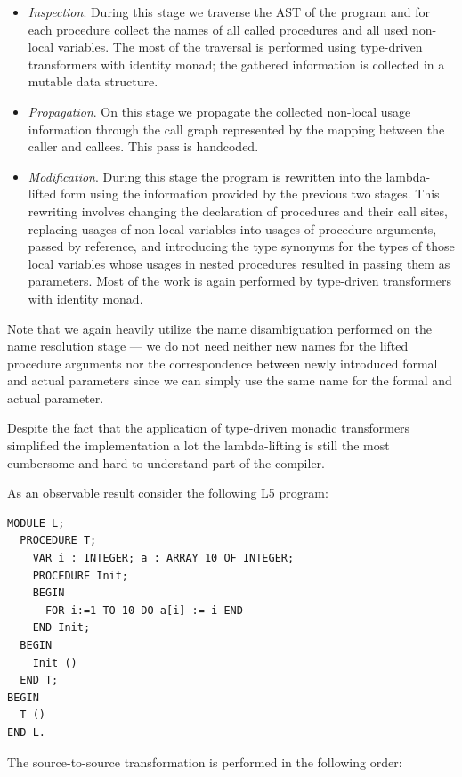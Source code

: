 \begin{itemize}
\item \emph{Inspection}. During this stage we traverse the AST of the program and for each procedure collect the 
names of all called procedures and all used non-local variables. The most of the 
traversal is performed using type-driven transformers with identity monad; the gathered information is 
collected in a mutable data structure. 

\item \emph{Propagation}. On this stage we propagate the collected non-local usage information through the call
graph represented by the mapping between the caller and callees. This pass is handcoded.

\item \emph{Modification}. During this stage the program is rewritten into the lambda-lifted form using the information
provided by the previous two stages. This rewriting involves changing the declaration of procedures and
their call sites, replacing usages of non-local variables into usages of procedure arguments, passed by 
reference, and introducing the type synonyms for the types of those local variables whose usages in 
nested procedures resulted in passing them as parameters. Most of the work is again performed by
type-driven transformers with identity monad.
\end{itemize}

Note that we again heavily utilize the name disambiguation performed on the name resolution stage --- we do
not need neither new names for the lifted procedure arguments nor the correspondence between newly introduced
formal and actual parameters since we can simply use the same name for the formal and actual parameter.

Despite the fact that the application of type-driven monadic transformers simplified the implementation a lot the
lambda-lifting is still the most cumbersome and hard-to-understand part of the compiler.

As an observable result consider the following L5 program:

\begin{lstlisting}[language=oberon0]
MODULE L;
  PROCEDURE T;
    VAR i : INTEGER; a : ARRAY 10 OF INTEGER;
    PROCEDURE Init;
    BEGIN
      FOR i:=1 TO 10 DO a[i] := i END
    END Init;
  BEGIN
    Init ()  
  END T;
BEGIN
  T ()
END L.
\end{lstlisting}

The source-to-source transformation is performed in the following order:

